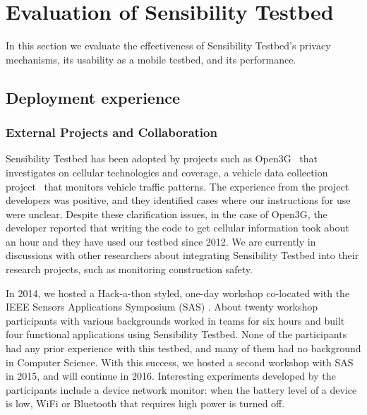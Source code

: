\section{Evaluation of Sensibility Testbed}

In this section we evaluate the effectiveness of Sensibility Testbed's 
privacy mechanisms, its usability as a mobile testbed, and its 
performance.






\subsection{Deployment experience}\label{sec-deployment}


\subsubsection{External Projects and Collaboration}\label{sec-external}

Sensibility Testbed has been adopted by projects such as 
Open3G~\cite{open3g} that investigates on cellular technologies 
and coverage, a vehicle data collection project~\cite{reininger2015first} 
that monitors vehicle traffic patterns. The experience from the 
project developers was positive, and they identified cases where our 
instructions for use were unclear. Despite these clarification issues, in 
the case of Open3G, the developer reported that writing the code to
get cellular information took about an hour and they have used our
testbed since 2012. We are currently in discussions with other 
researchers about integrating Sensibility Testbed into their research
projects, such as monitoring construction safety.

In 2014, we hosted a Hack-a-thon styled, one-day workshop co-located with 
the IEEE Sensors Applications Symposium (SAS) \cite{sas}. About twenty 
workshop participants with various backgrounds worked in teams 
for six hours and built four functional applications using Sensibility 
Testbed. None of the participants had any prior experience with 
this testbed, and many of them had no background in Computer
Science. With this success, we hosted a second workshop with 
SAS in 2015, and will continue in 2016. Interesting experiments 
developed by the participants include a device network monitor: 
when the battery level of a device is low, WiFi or Bluetooth that 
requires high power is turned off.



